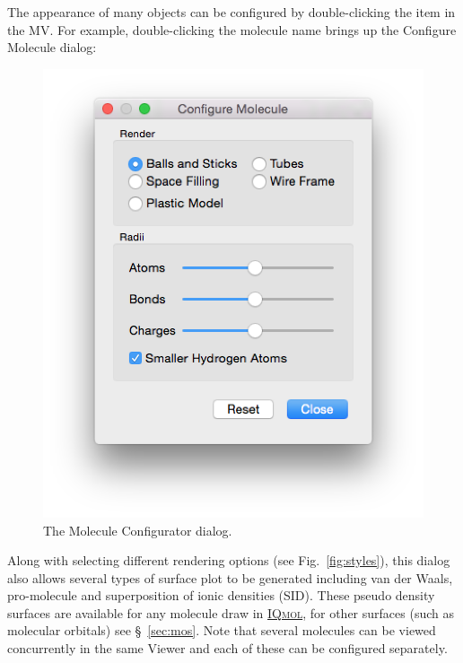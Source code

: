 \documentclass[a4paper,12pt]{article}
\newcommand{\iqmol}{\href{http://iqmol.org}{{\scshape IQmol}}}
\begin{document}
The appearance of many objects can be configured by double-clicking the item in
the MV.  For example, double-clicking the molecule name brings up the Configure
Molecule dialog:
\begin{figure}[h]
\begin{center}
\includegraphics[scale=0.39]{figures/MoleculeConfigurator.png}
\caption{The Molecule Configurator dialog.}
\label{fig:config}
\end{center}
\end{figure}
Along with selecting different rendering options (see Fig.~\ref{fig:styles}),
this dialog also allows several types of surface plot to be generated including
van der Waals, pro-molecule and superposition of ionic densities (SID).  These
pseudo density surfaces are available for any molecule draw in \iqmol{}, for
other surfaces (such as molecular orbitals) see \S\ \ref{sec:mos}.
Note that several molecules can be viewed concurrently in the same Viewer
and each of these can be configured separately.  
\end{document}

